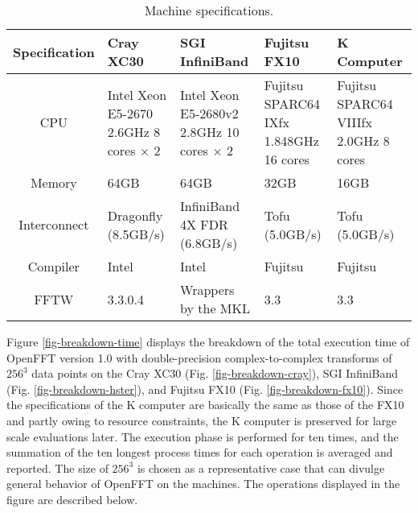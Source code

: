 \begin{table}
\begin{center}
\caption{Machine specifications.}
\label{tab-spec-machine}
\begin{tabular}{| c || m{} | m{} | m{} | m{} |}
\hline
Specification & Cray XC30 & SGI InfiniBand & Fujitsu FX10 & K   \quad\quad\quad Computer \\
\hline
CPU           & Intel Xeon E5-2670 2.6GHz 8 cores $\times$ 2 & Intel Xeon E5-2680v2 2.8GHz 10 cores $\times$ 2 &  Fujitsu SPARC64 IXfx 1.848GHz 16 cores  & Fujitsu SPARC64 VIIIfx 2.0GHz 8 cores   \\
\hline
Memory        &     64GB  &   64GB   & 32GB &   16GB        \\
\hline
Interconnect  & Dragonfly (8.5GB/s) &  InfiniBand 4X FDR (6.8GB/s) &  Tofu (5.0GB/s)   &   Tofu (5.0GB/s)    \\
\hline
Compiler     &     Intel &  Intel   &  Fujitsu  &     Fujitsu       \\
\hline
FFTW          &  3.3.0.4 &  Wrappers by the MKL &   3.3   &   3.3      \\
\hline
\end{tabular}
\end{center}
\end{table}

Figure \ref{fig-breakdown-time} displays the breakdown of the total execution time of OpenFFT version 1.0 with double-precision complex-to-complex transforms of $256^3$ data points on the Cray XC30 (Fig. \ref{fig-breakdown-cray}), SGI InfiniBand (Fig. \ref{fig-breakdown-hster}), and Fujitsu FX10 (Fig. \ref{fig-breakdown-fx10}). Since the specifications of the K computer are basically the same as those of the FX10 and partly owing to resource constraints, the K computer is preserved for large scale evaluations later. The execution phase is performed for ten times, and the summation of the ten longest process times for each operation is averaged and reported. The size of $256^3$ is chosen as a representative case that can divulge general behavior of OpenFFT on the machines. The operations displayed in the figure are described below. 

